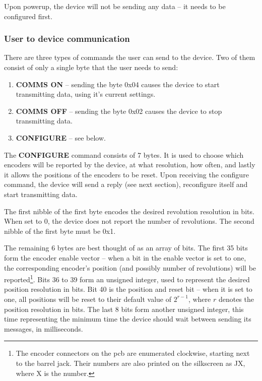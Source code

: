 \documentclass[twoside]{article}
\begin{document}
Upon powerup, the device will not be sending any data -- it needs to be configured first.

\subsubsection{User to device communication}

There are three types of commands the user can send to the device. Two of them consist of only a single byte that the user needs to send:

\begin{enumerate}
\item \textbf{COMMS ON} -- sending the byte 0x04 causes the device to start transmitting data, using it's current settings.
\item \textbf{COMMS OFF} -- sending the byte 0x02 causes the device to stop transmitting data.
\item \textbf{CONFIGURE} -- see below.
\end{enumerate}

The \textbf{CONFIGURE} command consists of 7 bytes. It is used to choose which encoders will be reported by the device, at what resolution, how often, and lastly it allows the positions of the encoders to be reset. Upon receiving the configure command, the device will send a reply (see next section), reconfigure itself and start transmitting data.

The first nibble of the first byte encodes the desired revolution resolution in bits. When set to 0, the device does not report the number of revolutions. The second nibble of the first byte must be 0x1. 

The remaining 6 bytes are best thought of as an array of bits. The first 35 bits form the encoder enable vector -- when a bit in the enable vector is set to one, the corresponding encoder's position (and possibly number of revolutions) will be reported\footnote{The encoder connectors on the pcb are enumerated clockwise, starting next to the barrel jack. Their numbers are also printed on the silkscreen as JX, where X is the number.}. Bits 36 to 39 form an unsigned integer, used to represent the desired position resolution in bits. Bit 40 is the position and  reset bit -- when it is set to one, all positions will be reset to their default value of $2^{r-1}$, where $r$ denotes the position resolution in bits. The last 8 bits form another unsigned integer, this time representing the minimum time the device should wait between sending its messages, in milliseconds.
\end{document}

